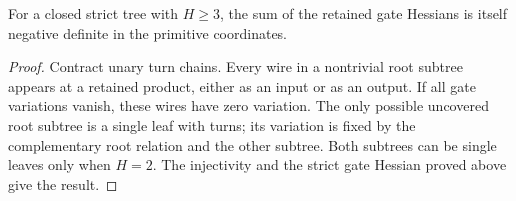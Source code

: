 \begin{lemma}\label{st:gate-curvature}
For a closed strict tree with $H\ge3$, the sum of the
retained gate Hessians is itself negative definite
in the primitive coordinates.
\end{lemma}
\begin{proof}
Contract unary turn chains. Every wire in a nontrivial
root subtree appears at a retained product, either
as an input or as an output. If all gate variations
vanish, these wires have zero variation. The only
possible uncovered root subtree is a single leaf
with turns; its variation is fixed by the complementary
root relation and the other subtree. Both subtrees
can be single leaves only when $H=2$. The injectivity
and the strict gate Hessian proved above give the result.
\end{proof}
